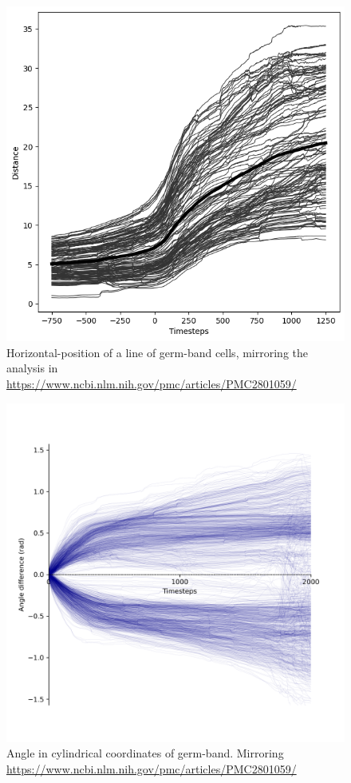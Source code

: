 \begin{figure}[H]
    \centering
    \includegraphics[width=1\linewidth]{chapters/Appendix/germbandMovementQuant.png}
    \caption{Horizontal-position of a line of germ-band cells, mirroring the analysis in  \url{https://www.ncbi.nlm.nih.gov/pmc/articles/PMC2801059/}}
    \label{fig:enter-label}
\end{figure}
\begin{figure}[H]
    \centering
    \includegraphics[width=1\linewidth]{chapters/Appendix/the_ring.png}
    \caption{Angle in cylindrical coordinates of germ-band. Mirroring \url{https://www.ncbi.nlm.nih.gov/pmc/articles/PMC2801059/}}
    \label{fig:enter-label}
\end{figure}
